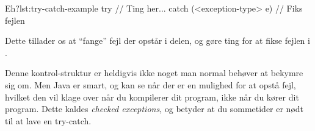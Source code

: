 	\begin{JavaCode}{Eh?}{lst:try-catch-example}
		try {
			// Ting her...
		} catch (<exception-type> e) {
			// Fiks fejlen
		}
	\end{JavaCode}

	Dette tillader os at ``fange'' fejl der opstår i 
	delen, og gøre ting for at fikse fejlen i .

	Denne kontrol-struktur er heldigvis ikke noget man normal behøver at bekymre
	sig om. Men Java er smart, og kan se når der er en mulighed for at opstå
	fejl, hvilket den vil klage over når du kompilerer dit program, ikke når du
	kører dit program. Dette kaldes \emph{checked exceptions}, og betyder at du
	sommetider er nødt til at lave en try-catch.



